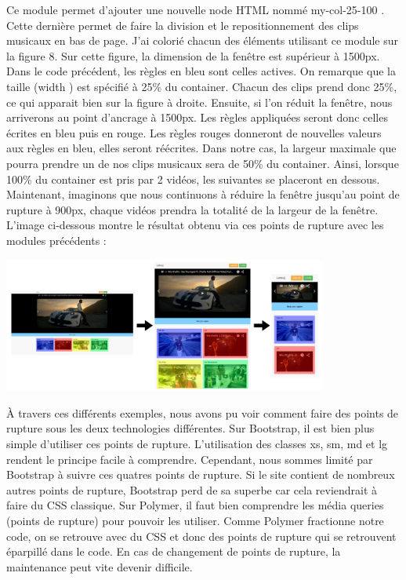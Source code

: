 \documentclass{article}
\begin{document}
Ce module permet d'ajouter une nouvelle node HTML nomm\'e \og my-col-25-100 \fg{}. Cette derni\`ere permet de faire la division et le repositionnement des clips musicaux en bas de page. J'ai colori\'e chacun des \'el\'ements utilisant ce module sur la figure 8. Sur cette figure, la dimension de la fen\^etre est sup\'erieur \`a 1500px. Dans le code pr\'ec\'edent, les r\`egles en bleu sont celles actives. On remarque que la taille (\og width \fg{} ) est sp\'ecifi\'e \`a 25\% du container. Chacun des clips prend donc 25\%, ce qui apparait bien sur la figure \`a droite. Ensuite, si l'on r\'eduit la fen\^etre, nous arriverons au point d'ancrage \`a 1500px. Les r\`egles appliqu\'ees seront donc celles \'ecrites en bleu puis en rouge. Les r\`egles rouges donneront de nouvelles valeurs aux r\`egles en bleu, elles seront r\'e\'ecrites. Dans notre cas, la largeur maximale que pourra prendre un de nos clips musicaux sera de 50\% du container. Ainsi, lorsque 100\% du container est pris par 2 vid\'eos, les suivantes se placeront en dessous. Maintenant, imaginons que nous continuons \`a r\'eduire la fen\^etre jusqu'au point de rupture \`a 900px, chaque vid\'eos prendra la totalit\'e de la largeur de la fen\^etre. L'image ci-dessous montre le r\'esultat obtenu via ces points de rupture avec les modules pr\'ec\'edents :

\begin{center}
\vspace{0.5cm}
\includegraphics[width=0.8\textwidth]{pc7}
\vspace{0.5cm}\\
\end{center}

\`A travers ces diff\'erents exemples, nous avons pu voir comment faire des points de rupture sous les deux technologies diff\'erentes. Sur Bootstrap, il est bien plus simple d'utiliser ces points de rupture. L'utilisation des classes xs, sm, md et lg rendent le principe facile \`a comprendre. Cependant, nous sommes limit\'e par Bootstrap \`a suivre ces quatres points de rupture. Si le site contient de nombreux autres points de rupture, Bootstrap perd de sa superbe car cela reviendrait \`a faire du CSS classique. Sur Polymer, il faut bien comprendre les m\'edia queries (points de rupture) pour pouvoir les utiliser. Comme Polymer fractionne notre code, on se retrouve avec du CSS et donc des points de rupture qui se retrouvent \'eparpill\'e dans le code. En cas de changement de points de rupture, la maintenance peut vite devenir difficile. 
\end{document}
